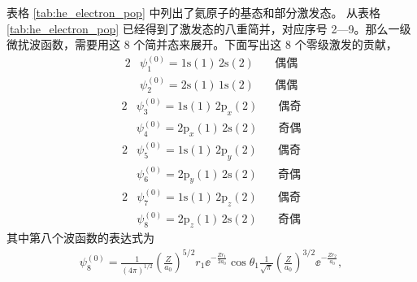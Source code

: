 表格 \ref{tab:he_electron_pop} 中列出了氦原子的基态和部分激发态。
从表格 \ref{tab:he_electron_pop} 已经得到了激发态的八重简并，对应序号 2---9。那么一级微扰波函数，需要用这 8 个简并态来展开。下面写出这 8 个零级激发的贡献，
\begin{alignat}{2}
&\psi_1^{(0)} = \mathrm{1s(1)\,2s(2)} &\quad \text{偶偶} \\
&\psi_2^{(0)} = \mathrm{2s(1)\,1s(2)} &\quad \text{偶偶}
\end{alignat}
\begin{alignat}{2}
&\psi_3^{(0)} = \mathrm{1s(1)\,2p}_x(2) &\quad \text{偶奇} \\
&\psi_4^{(0)} = \mathrm{2p}_x(1)\,2\mathrm{s}(2) &\quad \text{奇偶}
\end{alignat}
\begin{alignat}{2}
&\psi_5^{(0)} = \mathrm{1s(1)\,2p}_y(2) &\quad \text{偶奇} \\
&\psi_6^{(0)} = \mathrm{2p}_y(1)\,2\mathrm{s}(2) &\quad \text{奇偶}
\end{alignat}
\begin{alignat}{2}
&\psi_7^{(0)} = \mathrm{1s(1)\,2p}_z(2) &\quad \text{偶奇} \\
&\psi_8^{(0)} = \mathrm{2p}_z(1)\,2\mathrm{s}(2) &\quad \text{奇偶}
\end{alignat}
其中第八个波函数的表达式为
\begin{align}
    \psi_8^{(0)} = \frac1{(4\pi)^{1/2}} \left(\frac Z{a_0}\right)^{5/2} r_1 \ee^{-\frac{Z r_1}{2a_0}} \cos\theta_1 \frac1{\sqrt{\pi}} \left(\frac{Z}{a_0}\right)^{3/2} \ee^{-\frac{Zr_2}{a_0}}, 
\end{align}



